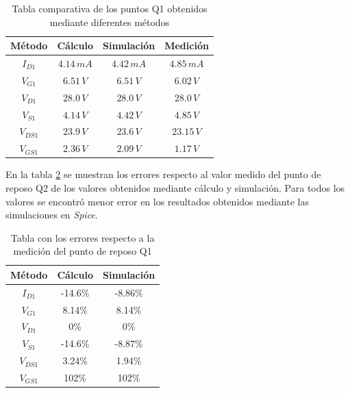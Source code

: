 \documentclass[10pt,spanish,a4paper,notitlepage]{article}
\begin{document}
\begin{table}[H]
\centering
\begin{tabular}{|c|c|c|c|} %
\hline
Método & Cálculo &  Simulación & Medición \\ \hline
$I_{D1}$ & $4.14\,\unit{mA}$  &  $4.42\,\unit{mA}$ & $4.85\,\unit{mA}$   \\ \hline
$V_{G1}$ & $6.51\,\unit{V}$ & $6.51\,\unit{V}$  &  $6.02\,\unit{V}$  \\ \hline
$V_{D1}$ & $28.0\,\unit{V}$ & $28.0\,\unit{V}$  &  $28.0\,\unit{V}$  \\ \hline
$V_{S1}$ & $4.14\,\unit{V}$ & $4.42\,\unit{V}$  &  $4.85\,\unit{V}$  \\ \hline
$V_{DS1}$ & $23.9\,\unit{V}$ & $23.6\,\unit{V}$  &  $23.15\,\unit{V}$  \\ \hline
$V_{GS1}$ & $2.36\,\unit{V}$ & $2.09\,\unit{V}$ & $1.17\,\unit{V}$  \\ \hline
\end{tabular}
\caption{Tabla comparativa de los puntos Q1 obtenidos mediante diferentes métodos}
\label{table:B_comparacion_Q1}
\end{table}

En la tabla \ref{table:B_errores_Q1} se muestran los errores respecto al valor medido
del punto de reposo Q2 de los valores obtenidos mediante cálculo y simulación.
Para todos los valores se encontró menor error en los resultados obtenidos
mediante las simulaciones en \emph{Spice}.

\begin{table}[H]
\centering
\begin{tabular}{|c|c|c|} %
\hline
Método & Cálculo &  Simulación  \\ \hline
$I_{D1}$ & -14.6\%  & -8.86\%  \\ \hline
$V_{G1}$ & 8.14\% & 8.14\% \\ \hline
$V_{D1}$ & 0\% & 0\%  \\ \hline
$V_{S1}$ & -14.6\% & -8.87\%  \\ \hline
$V_{DS1}$ & 3.24\% & 1.94\%  \\ \hline
$V_{GS1}$ & 102\% & 102\%  \\ \hline
\end{tabular}
\caption{Tabla con los errores respecto a la medición del punto de reposo Q1}
\label{table:B_errores_Q1}
\end{table}
\end{document}
